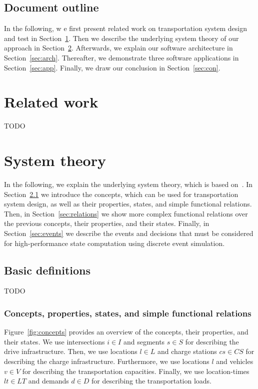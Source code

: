 \documentclass{article}
\begin{document}
    \subsection*{Document outline}
    In the following, w e first present related work on transportation system design and test in Section~\ref{sec:related}.
    Then we describe the underlying system theory of our approach in Section~\ref{sec:theory}.
    Afterwards, we explain our software architecture in Section~\ref{sec:arch}.
    Thereafter, we demonstrate three software applications in Section~\ref{sec:app}.
    Finally, we draw our conclusion in Section~\ref{sec:con}.

    \section{Related work}
    \label{sec:related}
    TODO

    \section{System theory}
    \label{sec:theory}
    In the following, we explain the underlying system theory, which is based on~\cite{Ascher2014,Ascher2015,Ascher2016,Ascher2017}.
    In Section~\ref{sec:concepts} we introduce the concepts, which can be used for transportation system design, as well as their properties, states, and simple functional relations.
    Then, in Section~\ref{sec:relations} we show more complex functional relations over the previous concepts, their properties, and their states.
    Finally, in Section~\ref{sec:events} we describe the events and decisions that must be considered for high-performance state computation using discrete event simulation.

    \subsection{Basic definitions}
    \label{sec:concepts}
    TODO

    \subsubsection{Concepts, properties, states, and simple functional relations}
    Figure~\ref{fig:concepts} provides an overview of the concepts, their properties, and their states.
    We use intersections $i \in I$ and segments $s \in S$ for describing the drive infrastructure.
    Then, we use locations $l \in L$ and charge stations $cs \in CS$ for describing the charge infrastructure.
    Furthermore, we use locations $l$ and vehicles $v \in V$ for describing the transportation capacities.
    Finally, we use location-times $lt \in LT$ and demands $d \in D$ for describing the transportation loads.
\end{document}
